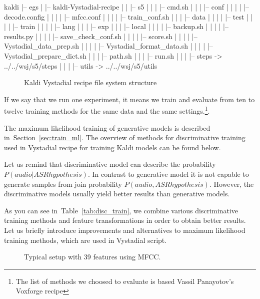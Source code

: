 \tiny\begin{verbbox}
kaldi
|-- egs
|   |-- kaldi-Vystadial-recipe
|   |   |-- s5
|   |   |   |-- cmd.sh
|   |   |   |-- conf
|   |   |   |   |-- decode.config
|   |   |   |   |-- mfcc.conf
|   |   |   |   |-- train_conf.sh
|   |   |   |-- data
|   |   |   |   |-- test 
|   |   |   |   |-- train
|   |   |   |   |-- lang
|   |   |   |-- exp
|   |   |   |-- local
|   |   |   |   |-- backup.sh
|   |   |   |   |-- results.py
|   |   |   |   |-- save_check_conf.sh
|   |   |   |   |-- score.sh
|   |   |   |   |-- Vystadial_data_prep.sh
|   |   |   |   |-- Vystadial_format_data.sh
|   |   |   |   |-- Vystadial_prepare_dict.sh
|   |   |   |-- path.sh
|   |   |   |-- run.sh
|   |   |   |-- steps -> ../../wsj/s5/steps
|   |   |   |-- utils -> ../../wsj/s5/utils
\end{verbbox}
\normalsize

\begin{figure}[!htp]
\centering \theverbbox \caption{\small{Kaldi Vystadial recipe file system structure}}
\label{fig:ascii-box}
\end{figure}

If we say that we run one experiment, it means we train and evaluate from ten to twelve training methods 
for the same data and the same settings.\footnote{The list of methods we choosed to evaluate is based Vassil Panayotov's Voxforge recipe}.

The maximum likelihood training of generative models is described in~Section~\ref{sec:train_ml}.
The overview of methods for discriminative training used in Vystadial recipe for training Kaldi models
can be found below.

Let us remind that discriminative model can describe the probability $P(audio|ASR hypothesis)$.
In contrast to generative model it is not capable to generate samples from join probability $P(audio, ASR hypothesis)$. However, the discriminative models usually yield better results than generative models. 

As you can see in~Table~\ref{tab:disc_train}, we combine various discriminative training methods
and feature transformations in order to obtain better results. 
Let us briefly introduce improvements and alternatives to maximum likelihood training methods,
which are used in Vystadial script.

\begin{figure}
    \begin{center}
    
    \caption{Typical setup with 39 features using \ac{MFCC}.}
    \label{fig:delta} 
    \end{center}
\end{figure}

